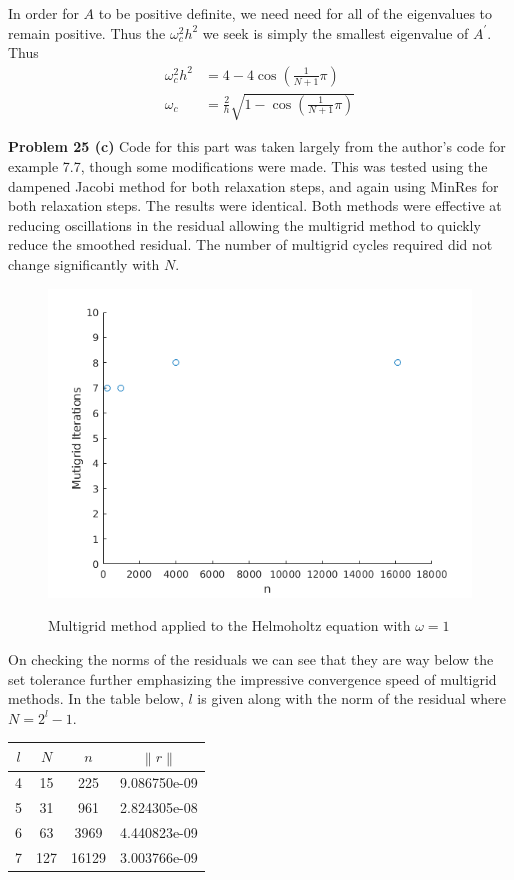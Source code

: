 \documentclass[12pt]{article}
\newcommand{\problem}[1]{\hspace{-4 ex} \large \textbf{Problem #1} }
\newcommand{\norm}[1]{\left\lVert#1\right\rVert}
\begin{document}
In order for $A$ to be positive definite, we need need for all of the eigenvalues to remain positive. Thus the $\omega_c^2h^2$ we seek is simply the smallest eigenvalue of $A^\prime$. Thus
\begin{align*}
	\omega_c^2h^2 & = 4 - 4 \cos\left(\frac{1 }{N+1}\pi \right) \\
	\omega_c & = \frac{2}{h} \sqrt{1- \cos\left(\frac{1 }{N+1}\pi \right)}
\end{align*}

\bigbreak

\problem{25 (c)} Code for this part was taken largely from the author's code for example 7.7, though some modifications were made. This was tested using the dampened Jacobi method for both relaxation steps, and again using MinRes for both relaxation steps. The results were identical. Both methods were effective at reducing oscillations in the residual allowing the multigrid method to quickly reduce the smoothed residual. The number of multigrid cycles required did not change significantly with $N$.

\begin{figure}[H]
	\caption{Multigrid method applied to the Helmoholtz equation with $\omega = 1$}
	\includegraphics[width=.75\textwidth]{hwch7_figure_4_multigrid_w1_jacobi}
	\label{multigrid}
	\centering
\end{figure}

On checking the norms of the residuals we can see that they are way below the set tolerance further emphasizing the impressive convergence speed of multigrid methods. In the table below, $l$ is given along with the norm of the residual where $N = 2^l-1$.

	\begin{center}
		\begin{tabular}{|c|c|c|c|}
			\hline
			$l$ & $N$ & $n$ & $\norm{r}$\\ \hline
			4& 15 & 225 & 9.086750e-09\\ \hline
			5& 31 & 961 & 2.824305e-08\\ \hline
			6& 63 & 3969 & 4.440823e-09\\ \hline
			7& 127 & 16129 & 3.003766e-09\\ \hline
		\end{tabular}
	\end{center}
	
\end{document}
